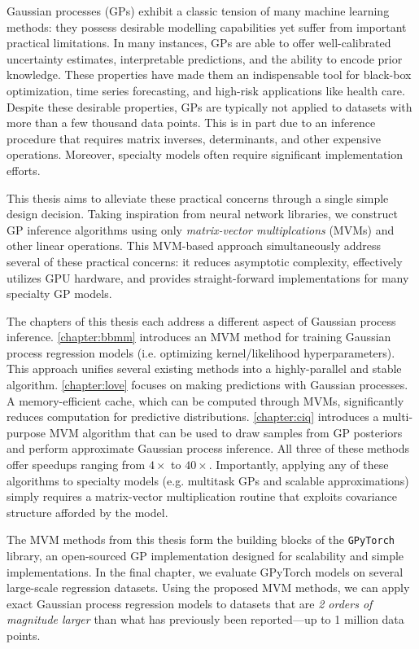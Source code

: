 Gaussian processes (GPs) exhibit a classic tension of many machine learning methods:
they possess desirable modelling capabilities yet suffer from important practical limitations.
In many instances, GPs are able to offer well-calibrated uncertainty estimates, interpretable predictions, and the ability to encode prior knowledge.
These properties have made them an indispensable tool for black-box optimization, time series forecasting, and high-risk applications like health care.
Despite these desirable properties, GPs are typically not applied to datasets with more than a few thousand data points.
This is in part due to an inference procedure that requires matrix inverses, determinants, and other expensive operations.
Moreover, specialty models often require significant implementation efforts.

This thesis aims to alleviate these practical concerns through a single simple design decision.
Taking inspiration from neural network libraries, we construct GP inference algorithms using only \emph{matrix-vector multiplcations} (MVMs) and other linear operations.
This MVM-based approach simultaneously address several of these practical concerns: it reduces asymptotic complexity, effectively utilizes GPU hardware, and provides straight-forward implementations for many specialty GP models.

The chapters of this thesis each address a different aspect of Gaussian process inference.
\cref{chapter:bbmm} introduces an MVM method for training Gaussian process regression models (i.e. optimizing kernel/likelihood hyperparameters).
This approach unifies several existing methods into a highly-parallel and stable algorithm.
\cref{chapter:love} focuses on making predictions with Gaussian processes.
A memory-efficient cache, which can be computed through MVMs, significantly reduces computation for predictive distributions.
\cref{chapter:ciq} introduces a multi-purpose MVM algorithm that can be used to draw samples from GP posteriors and perform approximate Gaussian process inference.
All three of these methods offer speedups ranging from $4\times$ to $40\times$.
Importantly, applying any of these algorithms to specialty models (e.g. multitask GPs and scalable approximations) simply requires a matrix-vector multiplication routine that exploits covariance structure afforded by the model.

The MVM methods from this thesis form the building blocks of the {\tt GPyTorch} library, an open-sourced GP implementation designed for scalability and simple implementations.
In the final chapter, we evaluate GPyTorch models on several large-scale regression datasets.
Using the proposed MVM methods, we can apply exact Gaussian process regression models to datasets that are \emph{2 orders of magnitude larger} than what has previously been reported---up to 1 million data points.
